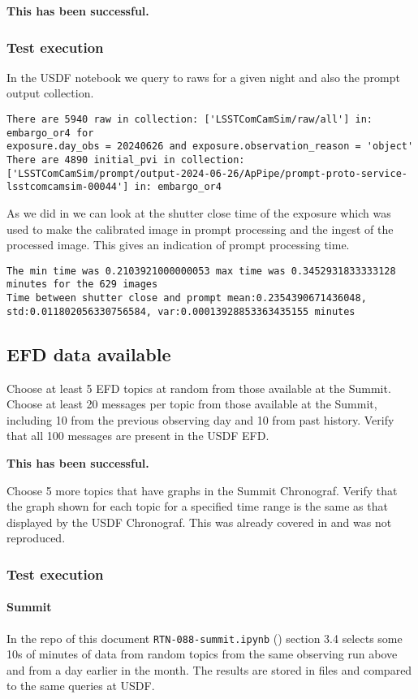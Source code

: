 \textbf{This has been successful.}
\subsubsection{Test execution}
In the USDF notebook we query to raws for a given night and also the prompt output collection.

\begin{lstlisting}
There are 5940 raw in collection: ['LSSTComCamSim/raw/all'] in: embargo_or4 for
exposure.day_obs = 20240626 and exposure.observation_reason = 'object'
There are 4890 initial_pvi in collection:
['LSSTComCamSim/prompt/output-2024-06-26/ApPipe/prompt-proto-service-
lsstcomcamsim-00044'] in: embargo_or4
\end{lstlisting}

As we did in  we can look at the shutter close time of the exposure which was used to make the calibrated image in prompt processing and the ingest of the processed image.
This gives an indication of prompt processing time.
\begin{lstlisting}
The min time was 0.2103921000000053 max time was 0.3452931833333128 minutes for the 629 images
Time between shutter close and prompt mean:0.2354390671436048, std:0.011802056330756584, var:0.00013928853363435155 minutes
\end{lstlisting}


\subsection{EFD data available }
Choose at least 5 EFD topics at random from those available at the Summit.
Choose at least 20 messages per topic from those available at the Summit, including 10 from the previous observing day and 10 from past history.
Verify that all 100 messages are present in the USDF EFD.

\textbf{This has been successful.}

Choose 5 more topics that have graphs in the Summit Chronograf. Verify that the graph
shown for each topic for a specified time range is the same as that displayed by the USDF
Chronograf.
This was already covered in \cite{RTN-053} and was not reproduced.


\subsubsection{Test execution}

\paragraph{Summit} \label{sec:efdsummit}
In the repo of this document \texttt{RTN-088-summit.ipynb} ()  section 3.4
selects some 10s of minutes of data from random topics from the same observing run above and from a day earlier in the month.
The results are stored in files and compared to the same  queries at USDF.

